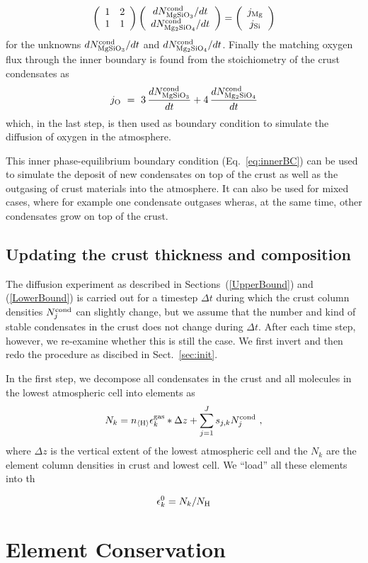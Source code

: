 \documentclass[11pt]{article}
\def\nH{n_{\langle\rm H\rangle}}
\def\ek{\epsilon_k}
\begin{document}
\begin{equation}
  \left(\begin{array}{cc} 1 & 2 \\ 
                          1 & 1 \end{array}\right)
  \left(\begin{array}{c} dN_{\rm MgSiO_3}^{\rm cond}/dt \\ 
                         dN_{\rm Mg_2SiO_4}^{\rm cond}/dt \end{array}\right)
  = 
  \left(\begin{array}{c} j_{\rm Mg} \\ j_{\rm Si}\end{array}\right)
\end{equation}
for the unknowns $dN_{\rm MgSiO_3}^{\rm cond}/dt$ and $dN_{\rm Mg_2SiO_4}^{\rm
  cond}/dt$. Finally the matching oxygen flux through the inner 
boundary is found from the stoichiometry of the crust condensates as
\begin{equation}
  j_{\rm O} ~=~ 3\, \frac{dN_{\rm MgSiO_3}^{\rm cond}}{dt}
             + 4\, \frac{dN_{\rm Mg_2SiO_4}^{\rm cond}}{dt}
\end{equation}
which, in the last step, is then used as boundary condition to simulate
the diffusion of oxygen in the atmosphere.

This inner phase-equilibrium boundary condition (Eq.~\ref{eq:innerBC}) can
be used to simulate the deposit of new condensates on top of the crust
as well as the outgasing of crust materials into the atmosphere. It can
also be used for mixed cases, where for example one condensate
outgases wheras, at the same time, other condensates grow on top of
the crust.


\subsection{Updating the crust thickness and composition}

The diffusion experiment as described in Sections~(\ref{UpperBound})
and (\ref{LowerBound}) is carried out for a timestep $\Delta t$ during
which the crust column densities $N_j^{\rm cond}$ can slightly change, but we
assume that the number and kind of stable condensates in the crust
does not change during $\Delta t$.  After each time step, however, we
re-examine whether this is still the case.  We first invert and then
redo the procedure as discibed in Sect.~\ref{sec:init}.
 
In the first step, we decompose all condensates in the crust
and all molecules in the lowest atmospheric cell into elements as
\begin{equation}
  N_k = \nH\ek^{\rm gas}*\Delta z + \sum_{j=1}^J s_{j,k}N_j^{\rm cond} \ ,
\end{equation}
where $\Delta z$ is the vertical extent of the lowest atmospheric cell and 
the $N_k$ are the element column densities in crust and lowest cell. We
``load'' all these elements into th

\begin{equation}
  \ek^0 = N_k/N_{\rm H}
\end{equation}


\section{Element Conservation}





\end{document}

